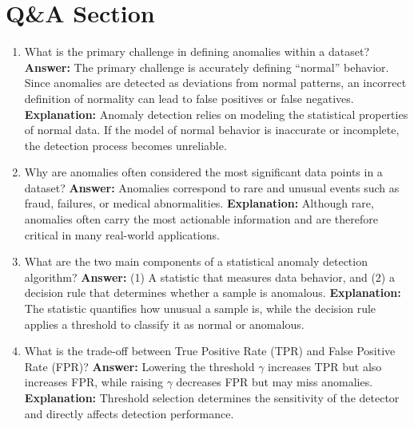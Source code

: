 \documentclass{article}
\begin{document}
\section{Q\&A Section}

\begin{enumerate}

\item What is the primary challenge in defining anomalies within a dataset?\newline
\textbf{Answer:} The primary challenge is accurately defining ``normal'' behavior. Since anomalies are detected as deviations from normal patterns, an incorrect definition of normality can lead to false positives or false negatives.\newline
\textbf{Explanation:} Anomaly detection relies on modeling the statistical properties of normal data. If the model of normal behavior is inaccurate or incomplete, the detection process becomes unreliable.

\item Why are anomalies often considered the most significant data points in a dataset?\newline
\textbf{Answer:} Anomalies correspond to rare and unusual events such as fraud, failures, or medical abnormalities.\newline
\textbf{Explanation:} Although rare, anomalies often carry the most actionable information and are therefore critical in many real-world applications.

\item What are the two main components of a statistical anomaly detection algorithm?\newline
\textbf{Answer:} (1) A statistic that measures data behavior, and (2) a decision rule that determines whether a sample is anomalous.\newline
\textbf{Explanation:} The statistic quantifies how unusual a sample is, while the decision rule applies a threshold to classify it as normal or anomalous.

\item What is the trade-off between True Positive Rate (TPR) and False Positive Rate (FPR)?\newline
\textbf{Answer:} Lowering the threshold $\gamma$ increases TPR but also increases FPR, while raising $\gamma$ decreases FPR but may miss anomalies.\newline
\textbf{Explanation:} Threshold selection determines the sensitivity of the detector and directly affects detection performance.


\end{enumerate}
\end{document}
